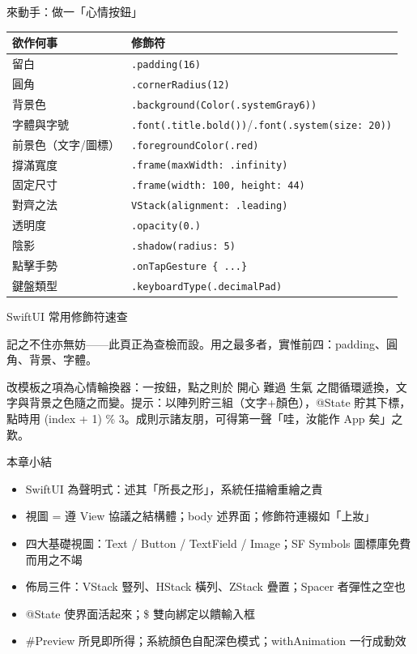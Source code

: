 \begin{tcbpractice}{來動手：做一「心情按鈕」}

\begin{center}
\begin{tabularx}{\linewidth}{|X|X|}
\hline
\textbf{欲作何事} & \textbf{修飾符} \tabularnewline
\hline
留白 & \texttt{.\allowbreak padding(16)} \tabularnewline
圓角 & \texttt{.\allowbreak cornerRadius(12)} \tabularnewline
背景色 & \texttt{.\allowbreak background(Color(.\allowbreak systemGray6))} \tabularnewline
字體與字號 & \texttt{.\allowbreak font(.\allowbreak title.\allowbreak bold())}/\texttt{.\allowbreak font(.\allowbreak system(size: 20))} \tabularnewline
前景色（文字/圖標） & \texttt{.\allowbreak foregroundColor(.\allowbreak red)} \tabularnewline
撐滿寬度 & \texttt{.\allowbreak frame(maxWidth: .\allowbreak infinity)} \tabularnewline
固定尺寸 & \texttt{.\allowbreak frame(width: 100, height: 44)} \tabularnewline
對齊之法 & \texttt{VStack(alignment: .\allowbreak leading)} \tabularnewline
透明度 & \texttt{.\allowbreak opacity(0.\allowbreak 6)} \tabularnewline
陰影 & \texttt{.\allowbreak shadow(radius: 5)} \tabularnewline
點擊手勢 & \texttt{.\allowbreak onTapGesture \{ .\allowbreak .\allowbreak .\allowbreak  \}} \tabularnewline
鍵盤類型 & \texttt{.\allowbreak keyboardType(.\allowbreak decimalPad)} \tabularnewline
\hline
\end{tabularx}
\end{center}

\begin{center}\small\color{gray}SwiftUI 常用修飾符速查\end{center}

記之不住亦無妨——此頁正為查檢而設。用之最多者，實惟前四：padding、圓角、背景、字體。

改模板之項為心情輪換器：一按鈕，點之則於 開心 難過 生氣 之間循環遞換，文字與背景之色隨之而變。提示：以陣列貯三組（文字+顏色），@State 貯其下標，點時用 (index + 1) \% 3。成則示諸友朋，可得第一聲「哇，汝能作 App 矣」之歎。

\end{tcbpractice}

\begin{tcbsummary}{本章小結}
\begin{itemize}
  \item SwiftUI 為聲明式：述其「所長之形」，系統任描繪重繪之責
  \item 視圖 = 遵 View 協議之結構體；body 述界面；修飾符連綴如「上妝」
  \item 四大基礎視圖：Text / Button / TextField / Image；SF Symbols 圖標庫免費而用之不竭
  \item 佈局三件：VStack 豎列、HStack 橫列、ZStack 疊置；Spacer 者彈性之空也
  \item @State 使界面活起來；\$ 雙向綁定以饋輸入框
  \item \#Preview 所見即所得；系統顏色自配深色模式；withAnimation 一行成動效
\end{itemize}

\end{tcbsummary}
